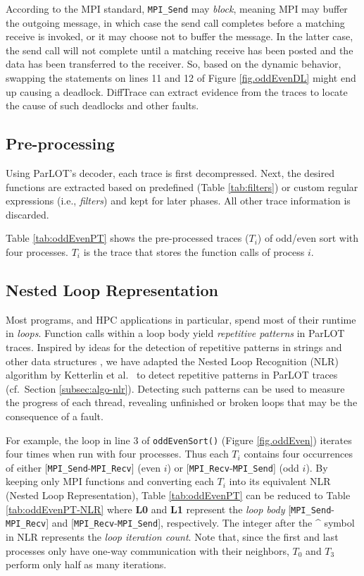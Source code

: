 According to the MPI standard, \texttt{MPI\_Send} may \textit{block}, meaning MPI may buffer the outgoing message, in which case the send call completes before a matching receive is invoked, or it may choose not to buffer the message. In the latter case, the send call will not complete until a matching receive has been posted and the data has been transferred to the receiver. So, based on the dynamic behavior, swapping the statements on lines 11 and 12 of Figure \ref{fig.oddEvenDL} might end up causing a deadlock. DiffTrace can extract evidence from the traces to locate the cause of such deadlocks and other faults.

\subsection{Pre-processing}

Using ParLOT's decoder, each trace is first decompressed.
Next, the desired functions are extracted based on predefined (Table \ref{tab:filters}) or custom regular expressions (i.e., \textit{filters}) and kept for later phases. All other trace information is discarded.

Table \ref{tab:oddEvenPT} shows the pre-processed traces ($T_i$) of odd/even sort with four processes. $T_i$ is the trace that stores the function calls of process $i$.



\subsection{Nested Loop Representation}



Most programs, and HPC applications in particular, spend most of their runtime in \textit{loops}. Function calls within a loop body yield \textit{repetitive patterns} in ParLOT traces. Inspired by ideas for the detection of repetitive patterns in strings \cite{nakamura_fast_2013} and other data structures \cite{kmr}, we have adapted the Nested Loop Recognition (NLR) algorithm by Ketterlin et al.~\cite{Ketterlin-nlr} to detect repetitive patterns in ParLOT traces (cf.~Section \ref{subsec:algo-nlr}). Detecting such patterns can be used to measure the progress of each thread, revealing unfinished or broken loops that may be the consequence of a fault.

For example, the loop in line 3 of \texttt{oddEvenSort()} (Figure \ref{fig.oddEven}) iterates four times when run with four processes. Thus each $T_i$ contains four occurrences of either [\texttt{MPI\_Send}-\texttt{MPI\_Recv}] (even $i$) or [\texttt{MPI\_Recv}-\texttt{MPI\_Send}] (odd $i$). By keeping only MPI functions and converting each $T_i$ into its equivalent NLR (Nested Loop Representation), Table \ref{tab:oddEvenPT} can be reduced to Table \ref{tab:oddEvenPT-NLR} where \textbf{L0} and \textbf{L1} represent the \textit{loop body} [\texttt{MPI\_Send}-\texttt{MPI\_Recv}] and [\texttt{MPI\_Recv}-\texttt{MPI\_Send}], respectively. The integer after the \^{} symbol in NLR represents the \textit{loop iteration count}. Note that, since the first and last processes only have one-way communication with their neighbors, $T_0$ and $T_3$ perform only half as many iterations.

